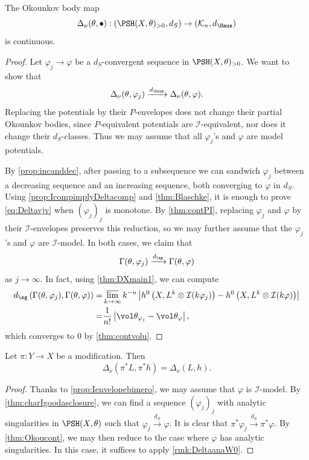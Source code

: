 \begin{theorem}\label{thm:Okoucont}
	The Okounkov body map
	\[
		\Delta_{\nu}(\theta,\bullet):\left( \PSH(X,\theta)_{>0},d_S\right)\rightarrow \left(\mathcal{K}_n,d_{\Haus}\right)
	\]
	is continuous.
\end{theorem}

\begin{proof}
Let $\varphi_j\to \varphi$ be a $d_S$-convergent sequence in $\PSH(X,\theta)_{>0}$.
	We want to show that
	\begin{equation}\label{eq:Deltavjv}
		\Delta_{\nu}(\theta,\varphi_j)\xrightarrow{d_{\Haus}}\Delta_{\nu}(\theta,\varphi).
	\end{equation}
	Replacing the potentials by their $P$-envelopes does not change their partial Okounkov bodies, since $P$-equivalent potentials are $\mathcal{I}$-equivalent, nor does it change their $d_S$-classes. Thus we may assume that all $\varphi_j$'s and $\varphi$ are model potentials.

	By \cref{prop:incanddec}, after passing to a subsequence we can sandwich $\varphi_j$ between a decreasing sequence and an increasing sequence, both converging to $\varphi$ in $d_S$. Using \cref{prop:IcompimplyDeltacomp} and \cref{thm:Blaschke}, it is enough to prove \eqref{eq:Deltavjv} when $(\varphi_j)_j$ is monotone. By \cref{thm:contPI}, replacing $\varphi_j$ and $\varphi$ by their $\mathcal{I}$-envelopes preserves this reduction, so we may further assume that the $\varphi_j$'s and $\varphi$ are $\mathcal{I}$-model.
 In both cases, we claim that
 \[
 \Gamma(\theta,\varphi_j)\xrightarrow{d_{\sg}} \Gamma(\theta,\varphi)
 \]
 as $j\to\infty$.
 In fact, using \cref{thm:DXmain1}, we can compute
 \[
 \begin{aligned}
 d_{\sg}\left(\Gamma(\theta,\varphi_j), \Gamma(\theta,\varphi)\right) = &\varlimsup_{k\to\infty} k^{-n}\left| h^0\left(X,L^k\otimes \mathcal{I}(k\varphi_j)\right)-h^0\left(X,L^k\otimes \mathcal{I}(k\varphi)\right) \right|\\
 =& \frac{1}{n!} \left| \vol \theta_{\varphi_j}-\vol \theta_{\varphi}\right|,
 \end{aligned}
 \]
 which converges to $0$ by \cref{thm:contvolu}.
\end{proof}

\begin{proposition}\label{prop:birinvO}
	Let $\pi \colon Y\rightarrow X$ be a modification. Then
	\[
		\Delta_{\nu}(\pi^*L,\pi^*h)=\Delta_{\nu}(L,h).
	\]
\end{proposition}
\begin{proof}
    Thanks to \cref{prop:Ienvelopebimero}, we may assume that $\varphi$ is $\mathcal{I}$-model.
   By \cref{thm:charIgoodasclosure}, we can find a sequence $(\varphi_j)_j$ with analytic singularities in $\PSH(X,\theta)$ such that $\varphi_j\xrightarrow{d_S}\varphi$. It is clear that $\pi^*\varphi_j\xrightarrow{d_S}\pi^*\varphi$.
    By \cref{thm:Okoucont}, we may then reduce to the case where $\varphi$ has analytic singularities. In this case, it suffices to apply \cref{rmk:DeltaanaW0}.
\end{proof}


